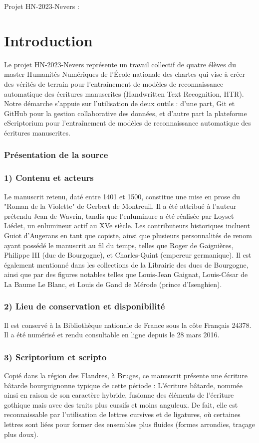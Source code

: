 \documentclass[12pt,a4paper,oneside]{article} %
\begin{document}
	
Projet HN-2023-Nevers : 

\section{Introduction}
Le projet HN-2023-Nevers représente un travail collectif de quatre élèves du master Humanités Numériques de l'École nationale des chartes qui vise à créer des vérités de terrain pour l'entraînement de modèles de reconnaissance automatique des écritures manuscrites (Handwritten Text Recognition, HTR). Notre démarche s'appuie sur l'utilisation de deux outils : d'une part, Git et GitHub pour la gestion collaborative des données, et d'autre part la plateforme eScriptorium pour l'entraînement de modèles de reconnaissance automatique des écritures manuscrites.
\subsubsection{Présentation de la source }
\subsubsection{1) Contenu et acteurs}
Le manuscrit retenu, daté entre 1401 et 1500, constitue une mise en prose du "Roman de la Violette" de Gerbert de Montreuil. Il a été attribué à l'auteur prétendu Jean de Wavrin, tandis que l'enluminure a été réalisée par Loyset Liédet, un enlumineur actif au XVe siècle. Les contributeurs historiques incluent Guiot d'Augerans en tant que copiste, ainsi que plusieurs personnalités de renom ayant possédé le manuscrit au fil du temps, telles que Roger de Gaignières, Philippe III (duc de Bourgogne), et Charles-Quint (empereur germanique). Il est également mentionné dans les collections de la Librairie des ducs de Bourgogne, ainsi que par des figures notables telles que Louis-Jean Gaignat, Louis-César de La Baume Le Blanc, et Louis de Gand de Mérode (prince d'Isenghien).
\subsubsection{2) Lieu de conservation et disponibilité}
Il est conservé à la Bibliothèque nationale de France sous la côte Français 24378.  Il a été numérisé et rendu consultable en ligne depuis le 28 mars 2016. 
\subsubsection{3) Scriptorium et scripto}
Copié dans la région des Flandres, à Bruges, ce manuscrit présente une écriture bâtarde bourguignonne typique de cette période : L'écriture bâtarde, nommée ainsi en raison de son caractère hybride, fusionne des éléments de l'écriture gothique mais avec des traits plus cursifs et moins anguleux. De fait, elle est reconnaissable par l'utilisation de lettres cursives et de ligatures, où certaines lettres sont liées pour former des ensembles plus fluides (formes arrondies, traçage plus doux). 
\end{document}

